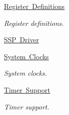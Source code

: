 \begin{DoxyCompactItemize}
\mbox{\hyperlink{group__lpc24xx__regs}{Register Definitions}}
\begin{DoxyCompactList}\small\item\em Register definitions. \end{DoxyCompactList}\item 
\mbox{\hyperlink{group__RTEMSBSPsARMLPC24XXSSP}{S\+S\+P Driver}}
\item 
\mbox{\hyperlink{group__lpc24xx__clock}{System Clocks}}
\begin{DoxyCompactList}\small\item\em System clocks. \end{DoxyCompactList}\item 
\mbox{\hyperlink{group__lpc__timer}{Timer Support}}
\begin{DoxyCompactList}\small\item\em Timer support. \end{DoxyCompactList}\end{DoxyCompactItemize}
